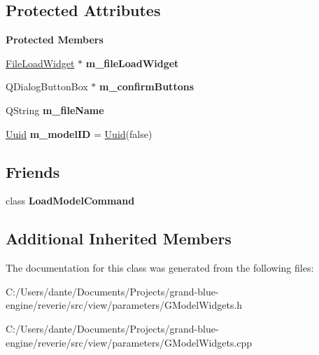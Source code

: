 \subsection*{Protected Attributes}
\begin{Indent}\textbf{ Protected Members}\par
\begin{DoxyCompactItemize}
\item 
\mbox{\label{classrev_1_1_view_1_1_load_model_widget_a00e8da47b7e2b65ac66fed6c9342bcbc}} 
\mbox{\hyperlink{classrev_1_1_view_1_1_file_load_widget}{File\+Load\+Widget}} $\ast$ {\bfseries m\+\_\+file\+Load\+Widget}
\item 
\mbox{\label{classrev_1_1_view_1_1_load_model_widget_a18abd8568772a172fb151a35432b7a9a}} 
Q\+Dialog\+Button\+Box $\ast$ {\bfseries m\+\_\+confirm\+Buttons}
\item 
\mbox{\label{classrev_1_1_view_1_1_load_model_widget_aec85be1d9193d9fd3f8e07831794369b}} 
Q\+String {\bfseries m\+\_\+file\+Name}
\item 
\mbox{\label{classrev_1_1_view_1_1_load_model_widget_ab304b83dda9fb3725fe94b4bda07f14d}} 
\mbox{\hyperlink{classrev_1_1_uuid}{Uuid}} {\bfseries m\+\_\+model\+ID} = \mbox{\hyperlink{classrev_1_1_uuid}{Uuid}}(false)
\end{DoxyCompactItemize}
\end{Indent}
\subsection*{Friends}
\begin{DoxyCompactItemize}
\item 
\mbox{\label{classrev_1_1_view_1_1_load_model_widget_a245a570af1a0eb02f44ae7319ce4d310}} 
class {\bfseries Load\+Model\+Command}
\end{DoxyCompactItemize}
\subsection*{Additional Inherited Members}


The documentation for this class was generated from the following files\+:\begin{DoxyCompactItemize}
\item 
C\+:/\+Users/dante/\+Documents/\+Projects/grand-\/blue-\/engine/reverie/src/view/parameters/G\+Model\+Widgets.\+h\item 
C\+:/\+Users/dante/\+Documents/\+Projects/grand-\/blue-\/engine/reverie/src/view/parameters/G\+Model\+Widgets.\+cpp\end{DoxyCompactItemize}
